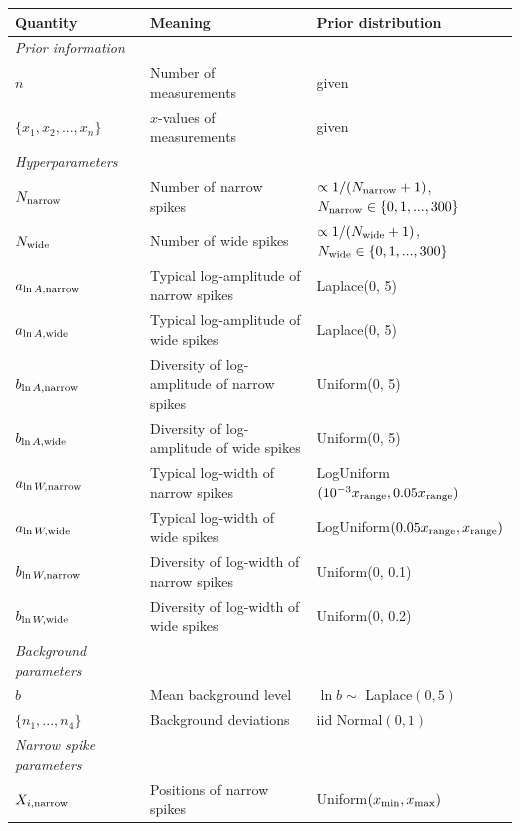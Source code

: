 \documentclass[a4paper, 12pt]{elsarticle}
\newcommand{\x}{x}
\begin{document}
\begin{landscape}

\begin{table}
\footnotesize
\centering
\begin{tabular}{|lll|}
\hline
{\bf Quantity}      &   {\bf Meaning}   &  {\bf Prior distribution}\\
\hline
{\em Prior information}&&\\
\hline
$n$ & Number of measurements & given\\
$\{\x_1, \x_2, ..., \x_n\}$  & $\x$-values of measurements & given \\
\hline
{\em Hyperparameters} & &\\
$N_{\rm narrow}$   &   Number of narrow spikes    &  $\propto 1/(N_{\rm narrow}+1)$, $N_{\rm narrow} \in \{0, 1, ..., 300\}$ \\
$N_{\rm wide}$   &   Number of wide spikes    &  $\propto 1/(N_{\rm wide}+1)$,
$N_{\rm wide} \in \{0, 1, ..., 300\}$ \\
$a_{\ln A, \rm narrow}$ & Typical log-amplitude of narrow spikes & Laplace(0, 5)\\
$a_{\ln A, \rm wide}$ & Typical log-amplitude of wide spikes & Laplace(0, 5)\\
$b_{\ln A, \rm narrow}$ & Diversity of log-amplitude of narrow spikes & Uniform(0, 5)\\
$b_{\ln A, \rm wide}$ & Diversity of log-amplitude of wide spikes & Uniform(0, 5)\\
$a_{\ln W, \rm narrow}$ & Typical log-width of narrow spikes & LogUniform$(10^{-3}x_{\rm range}, 0.05x_{\rm range})$\\
$a_{\ln W, \rm wide}$ & Typical log-width of wide spikes & LogUniform$(0.05x_{\rm range}, x_{\rm range})$\\
$b_{\ln W, \rm narrow}$ & Diversity of log-width of narrow spikes & Uniform(0, 0.1)\\
$b_{\ln W, \rm wide}$ & Diversity of log-width of wide spikes & Uniform(0, 0.2)\\
\hline
{\em Background parameters}&&\\
$b$       & Mean background level       & $\ln b \sim $ Laplace$(0, 5)$\\
$\{n_1, ..., n_4\}$  & Background deviations & iid Normal$(0,1)$\\
\hline
{\em Narrow spike parameters}&&\\
$X_{i, \rm narrow}$ & Positions of narrow spikes &
                            Uniform$(x_{\rm min}, x_{\rm max})$ \\

\end{tabular}
\end{table}
\end{landscape}
\end{document}
